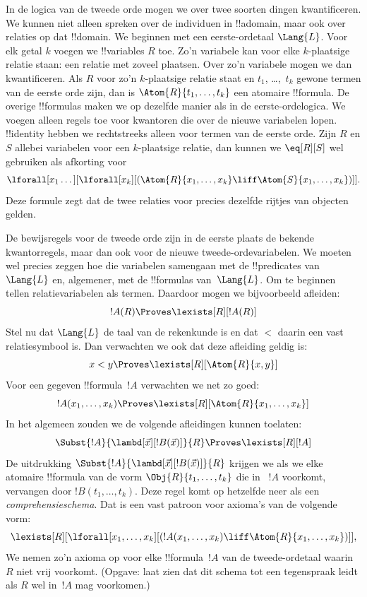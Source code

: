 \documentclass[openany]{memoir}
\begin{document}
In de logica van de tweede orde mogen we over twee soorten dingen
kwantificeren. We kunnen niet alleen spreken over de individuen in
!!a{domain}, maar ook over relaties op dat !!{domain}. We beginnen met een
eerste-ordetaal $\Lang{L}$. Voor elk getal $k$ voegen we !!{variable}s $R$
toe. Zo'n variabele kan voor elke $k$-plaatsige relatie staan: een relatie met
zoveel plaatsen. Over zo'n variabele mogen we dan kwantificeren. Als $R$ voor
zo'n $k$-plaatsige relatie staat en $t_1$, \dots,~$t_k$ gewone termen van de
eerste orde zijn,
dan is $\Atom{R}{t_1,\dots,t_k}$ een atomaire !!{formula}. De overige
!!{formula}s maken we op dezelfde manier als in de eerste-ordelogica. We
voegen alleen regels toe voor kwantoren die over de nieuwe variabelen lopen.
!!{identity} hebben we rechtstreeks alleen voor termen van de eerste orde.
Zijn $R$ en $S$ allebei variabelen voor een $k$-plaatsige relatie, dan kunnen
we $\eq[R][S]$ wel gebruiken als afkorting voor
\[
\lforall[x_1 \dots][\lforall[x_k][(\Atom{R}{x_1, \dots, x_k} \liff
  \Atom{S}{x_1, \dots, x_k})]].
\]
Deze formule zegt dat de twee relaties voor precies dezelfde rijtjes van
objecten gelden.

De bewijsregels voor de tweede orde zijn in de eerste plaats de bekende
kwantorregels, maar dan ook voor de nieuwe tweede-ordevariabelen. We moeten wel
precies zeggen hoe die variabelen samengaan met de !!{predicate}s van
~$\Lang{L}$ en, algemener, met de !!{formula}s van~$\Lang{L}$. Om te beginnen tellen relatievariabelen als
termen. Daardoor mogen we bijvoorbeeld afleiden:
\[
!A(R) \Proves \lexists[R][!A(R)]
\]
Stel nu dat $\Lang{L}$ de taal van de rekenkunde is en dat $<$ daarin een
vast relatiesymbool is. Dan verwachten we ook dat deze afleiding geldig is:
\[
x < y \Proves \lexists[R][\Atom{R}{x,y}]
\]
Voor een gegeven !!{formula}~$!A$ verwachten we net zo goed:
\[
!A(x_1, \dots, x_k) \Proves \lexists[R][\Atom{R}{x_1,\dots,x_k}]
\]
In het algemeen zouden we de volgende afleidingen kunnen toelaten:
\[
\Subst{!A}{\lambd[\vec x][!B(\vec x)]}{R} \Proves
\lexists[R][!A]
\]
De uitdrukking $\Subst{!A}{\lambd[\vec x][!B(\vec x)]}{R}$ krijgen we als
we elke atomaire !!{formula} van de vorm $\Obj{R}{t_1,\dots,t_k}$ die in
~$!A$ voorkomt, vervangen door $!B(t_1, \dots, t_k)$. Deze regel
komt op hetzelfde neer als een {\em comprehensieschema}. Dat is een vast
patroon voor axioma's van de volgende vorm:
\[
\lexists[R][\lforall[x_1, \dots, x_k][(!A(x_1, \dots, x_k) \liff
\Atom{R}{x_1, \dots, x_k})]],
\]
We nemen zo'n axioma op voor elke !!{formula}~$!A$ van de tweede-ordetaal
waarin $R$ niet vrij voorkomt. (Opgave: laat zien dat dit schema tot een
tegenspraak leidt als $R$ wel in~$!A$ mag voorkomen.)
\end{document}
